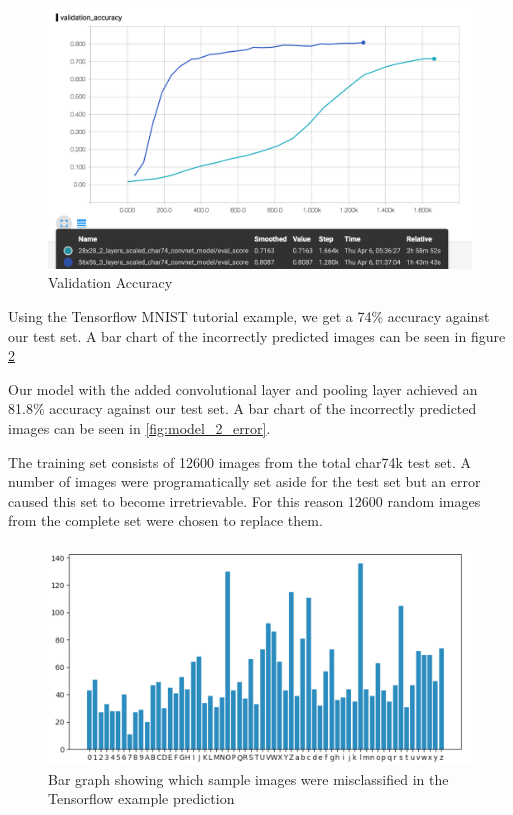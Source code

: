 \documentclass[11pt]{article}
\begin{document}
\begin{figure}
    \centering
    \includegraphics[scale=0.4]{validation_accuracy.png}
    \caption{Validation Accuracy}
    \label{fig:validation_accuracy}
\end{figure}

Using the Tensorflow MNIST tutorial example, we get a 74\% accuracy against our test set. A bar chart of the incorrectly predicted images can be seen in figure \ref{fig:model_1_error}

Our model with the added convolutional layer and pooling layer achieved an 81.8\% accuracy against our test set. A bar chart of the incorrectly predicted images can be seen in \ref{fig:model_2_error}.

The training set consists of 12600 images from the total char74k test set. A number of images were programatically set aside for the test set but an error caused this set to become irretrievable. For this reason 12600 random images from the complete set were chosen to replace them.

\begin{figure}
    \centering
    \includegraphics[scale=0.4]{model_1_errors.png}
    \caption{Bar graph showing which sample images were misclassified in the Tensorflow example prediction}
    \label{fig:model_1_error}
\end{figure}
\end{document}
